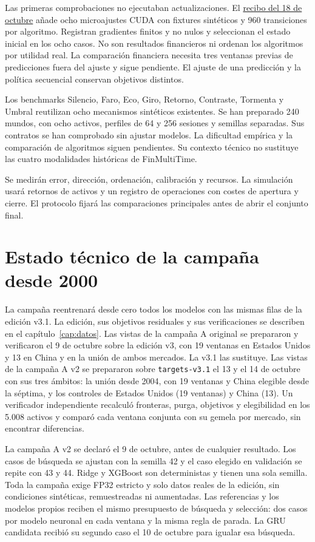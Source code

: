 \documentclass[11pt,a4paper]{report}
\begin{document}
Las primeras comprobaciones no ejecutaban actualizaciones. El
\href{https://github.com/GonxKZ/mars-titan/blob/8b7e2a5600be568cc1299f2a661da15b5090c45e/reports/research/memory-microstudy-20261018/README.md}{recibo del 18 de octubre}
añade ocho microajustes CUDA con fixtures sintéticos y 960 transiciones por
algoritmo. Registran gradientes finitos y no nulos y seleccionan el estado
inicial en los ocho casos. No son resultados financieros ni ordenan los
algoritmos por utilidad real. La comparación financiera necesita tres ventanas
previas de predicciones fuera del ajuste y sigue pendiente. El ajuste de una
predicción y la política secuencial conservan objetivos distintos.

Los benchmarks Silencio, Faro, Eco, Giro, Retorno, Contraste, Tormenta y Umbral
reutilizan ocho mecanismos sintéticos existentes. Se han preparado 240 mundos,
con ocho activos, perfiles de 64 y 256 sesiones y semillas separadas. Sus contratos
se han comprobado sin ajustar modelos. La dificultad empírica y la comparación
de algoritmos siguen pendientes. Su contexto técnico no sustituye las cuatro
modalidades históricas de FinMultiTime.

Se medirán error, dirección, ordenación, calibración y recursos. La simulación usará
retornos de activos y un registro de operaciones con costes de apertura y cierre.
El protocolo fijará las comparaciones principales antes de abrir el conjunto final.

\section{Estado técnico de la campaña desde 2000}
La campaña reentrenará desde cero todos los modelos con las mismas filas de la
edición v3.1. La edición, sus objetivos residuales y sus verificaciones se
describen en el capítulo~\ref{cap:datos}. Las vistas de la campaña A original
se prepararon y verificaron el 9 de octubre sobre la edición v3, con 19
ventanas en Estados Unidos y 13 en China y en la unión de ambos mercados. La
v3.1 las sustituye. Las vistas de la campaña A v2 se prepararon sobre
\texttt{targets-v3.1} el 13 y el 14 de octubre con sus tres ámbitos: la unión
desde 2004, con 19 ventanas y China elegible desde la séptima, y los controles
de Estados Unidos (19 ventanas) y China (13). Un verificador independiente
recalculó fronteras, purga, objetivos y elegibilidad en los 5.008 activos y
comparó cada ventana conjunta con su gemela por mercado, sin encontrar
diferencias.

La campaña A v2 se declaró el 9 de octubre, antes de cualquier resultado. Los
casos de búsqueda se ajustan con la semilla 42 y el caso elegido en validación
se repite con 43 y 44. Ridge y XGBoost son deterministas y tienen una sola
semilla. Toda la campaña exige FP32 estricto y solo datos reales de la
edición, sin condiciones sintéticas, remuestreadas ni aumentadas. Las
referencias y los modelos propios reciben el mismo presupuesto de búsqueda y
selección: dos casos por modelo neuronal en cada ventana y la misma regla de
parada. La GRU candidata recibió su segundo caso el 10 de octubre para igualar
esa búsqueda.
\end{document}
